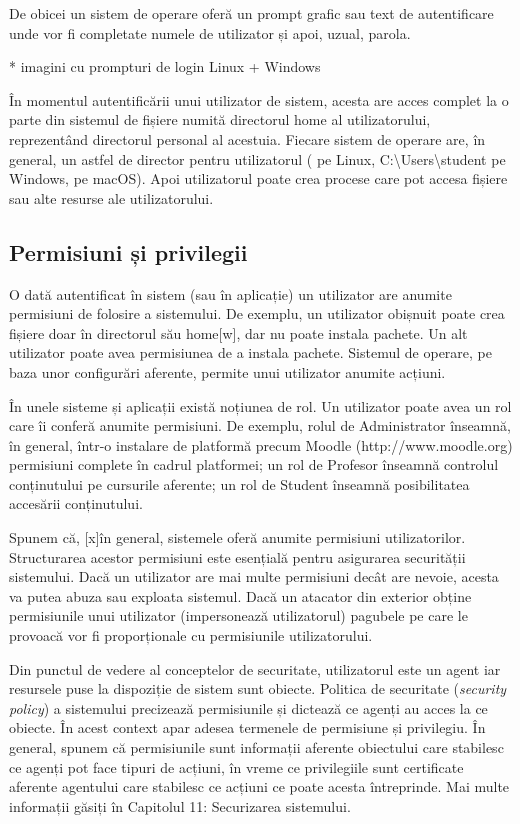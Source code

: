 De obicei un sistem de operare oferă un prompt grafic sau text de autentificare
unde vor fi completate numele de utilizator și apoi, uzual, parola.

* imagini cu prompturi de login Linux + Windows

În momentul autentificării unui utilizator de sistem, acesta are acces complet
la o parte din sistemul de fișiere numită directorul home al utilizatorului,
reprezentând directorul personal al acestuia. Fiecare sistem de operare are, în
general, un astfel de director pentru utilizatorul ( pe
Linux, C:\textbackslash{}Users\textbackslash{}student pe Windows,
 pe macOS). Apoi utilizatorul poate crea procese care pot
accesa fișiere sau alte resurse ale utilizatorului.

\subsection{Permisiuni și privilegii}
\label{sec:users-sistem}

O dată autentificat în sistem (sau în aplicație) un utilizator are anumite
permisiuni de folosire a sistemului. De exemplu, un utilizator obișnuit poate
crea fișiere doar în directorul său home[w], dar nu poate instala pachete. Un
alt utilizator poate avea permisiunea de a instala pachete. Sistemul de operare,
pe baza unor configurări aferente, permite unui utilizator anumite acțiuni.

În unele sisteme și aplicații există noțiunea de rol. Un utilizator poate avea
un rol care îi conferă anumite permisiuni. De exemplu, rolul de Administrator
înseamnă, în general, într-o instalare de platformă precum Moodle
(http://www.moodle.org) permisiuni complete în cadrul platformei; un rol de
Profesor înseamnă controlul conținutului pe cursurile aferente; un rol de
Student înseamnă posibilitatea accesării conținutului.

Spunem că, [x]în general, sistemele oferă anumite permisiuni utilizatorilor.
Structurarea acestor permisiuni este esențială pentru asigurarea securității
sistemului. Dacă un utilizator are mai multe permisiuni decât are nevoie, acesta
va putea abuza sau exploata sistemul. Dacă un atacator din exterior obține
permisiunile unui utilizator (impersonează utilizatorul) pagubele pe care le
provoacă vor fi proporționale cu permisiunile utilizatorului.

Din punctul de vedere al conceptelor de securitate, utilizatorul este un agent
iar resursele puse la dispoziție de sistem sunt obiecte. Politica de securitate
(\textit{security policy}) a sistemului precizează permisiunile și dictează ce
agenți au acces la ce obiecte. În acest context apar adesea termenele de
permisiune și privilegiu. În general, spunem că permisiunile sunt informații
aferente obiectului care stabilesc ce agenți pot face tipuri de acțiuni, în
vreme ce privilegiile sunt certificate aferente agentului care stabilesc ce
acțiuni ce poate acesta întreprinde. Mai multe informații găsiți în Capitolul
11: Securizarea sistemului.

